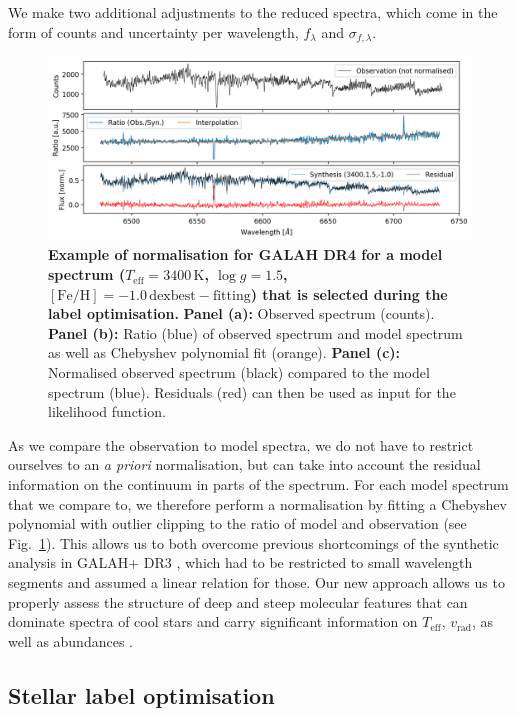 \documentclass[
  journal=pasa,
  manuscript=research-paper, %
  year=2024,
  volume=37
]{cup-journal}
\newcommand{\Teff}{$T_\mathrm{eff}$\xspace}
\newcommand{\vrad}{$v_\mathrm{rad}$\xspace}
\begin{document}
We make two additional adjustments to the reduced spectra, which come in the form of counts and uncertainty per wavelength, $f_\lambda$ and $\sigma_{f,\lambda}$.

\begin{figure}[ht]
\centering
\includegraphics[width=\textwidth]{figures/Nuisance_example.png}
\caption{
\textbf{Example of normalisation for GALAH DR4 for a model spectrum ($T_\mathrm{eff} = 3400\,\mathrm{K}$, $\log g = 1.5$, $\mathrm{[Fe/H]} = -1.0\,\mathrm{dexbest-fitting }$) that is selected during the label optimisation.}
\textbf{Panel (a):} Observed spectrum (counts).
\textbf{Panel (b):} Ratio (blue) of observed spectrum and model spectrum as well as Chebyshev polynomial fit (orange).
\textbf{Panel (c):} Normalised observed spectrum (black) compared to the model spectrum (blue). Residuals (red) can then be used as input for the likelihood function.
}
\label{fig:ratio_normalisation}
\end{figure}

As we compare the observation to model spectra, we do not have to restrict ourselves to an \textit{a priori} normalisation, but can take into account the residual information on the continuum in parts of the spectrum. For each model spectrum that we compare to, we therefore perform a normalisation by fitting a Chebyshev polynomial with outlier clipping to the ratio of model and observation (see Fig.~\ref{fig:ratio_normalisation}). This allows us to both overcome previous shortcomings of the synthetic analysis in GALAH+ DR3 \citep{Buder2021}, which had to be restricted to small wavelength segments and assumed a linear relation for those. Our new approach allows us to properly assess the structure of deep and steep molecular features that can dominate spectra of cool stars and carry significant information on \Teff, \vrad, as well as abundances \citep{Mann2012}.

\subsection{Stellar label optimisation}
\label{sec:stellar_label_optimisation}
\end{document}

